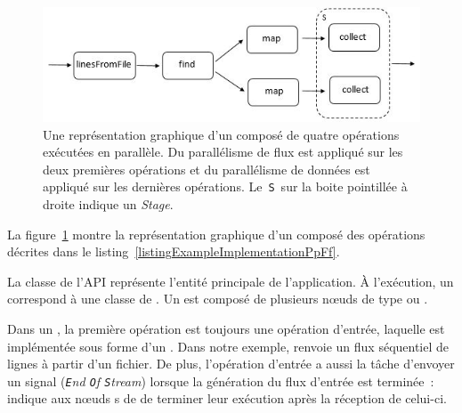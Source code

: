 \begin{figure}
\centering
     \includegraphics[width=\textwidth]{Figures/ExempleRuntimeExecution.jpg}
      \caption[Une repr\'esentation graphique d'un  compos\'e de quatre op\'erations.]{Une repr\'esentation graphique d'un  compos\'e de quatre op\'erations ex\'ecut\'ees en parall\`ele. Du parall\'elisme de flux est appliqu\'e sur les deux premi\`eres op\'erations et du parall\'elisme de donn\'ees est appliqu\'e sur les derni\`eres op\'erations. Le~\texttt{S}~sur la boite pointill\'ee \`a droite indique un \emph{Stage}.}
       \label{ExempleRuntimeExecution.fig}
\end{figure}



La figure~\ref{ExempleRuntimeExecution.fig} montre la repr\'esentation graphique d'un  compos\'e des op\'erations d\'ecrites dans le listing~\ref{listingExampleImplementationPpFf}.
 

La classe  de l'API repr\'esente l'entit\'e principale de l'application. \`A l'ex\'ecution, un  correspond \`a une classe  de . Un  est compos\'e de plusieurs nœuds de type  ou . 

Dans un , la premi\`ere op\'eration est toujours une op\'eration d'entr\'ee, laquelle est impl\'ement\'ee sous forme d'un . Dans notre exemple,  renvoie un flux s\'equentiel de lignes \`a partir d'un fichier. De plus, l'op\'eration d'entr\'ee a aussi la t\^ache d'envoyer un signal  (\emph{\texttt{E}nd \texttt{O}f \texttt{S}tream}) lorsque la g\'en\'eration du flux d'entr\'ee est termin\'ee~:  indique aux nœuds s de  de terminer leur ex\'ecution apr\`es la r\'eception de celui-ci.

